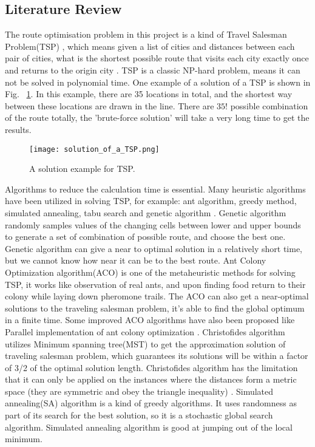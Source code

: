 \documentclass[project-plan]{report-template}
\begin{document}
\subsection {Literature Review}
The route optimisation problem in this project is a kind of Travel Salesman Problem(TSP) \cite{lawler1985travelling}, 
which means given a list of cities and distances between each pair of cities, what is the shortest possible
route that visits each city exactly once and returns to the origin city \cite{TSP_wiki}. 
TSP is a classic NP-hard problem, means it can not be solved in polynomial time.
One example of a solution of a TSP is shown in Fig.~ \ref{fig:solution_of_TSP}.
In this example, there are 35 locations in total, and the shortest way between these locations are drawn in the line.
There are $35!$ possible combination of the route totally, the 'brute-force solution' will take a very long time to get the results.\\
\begin{figure}
    \begin{center}
        \texttt{[image: solution\_of\_a\_TSP.png]}
    \end{center}
    \caption{\label{fig:solution_of_TSP} A solution example for TSP.}
\end{figure}

Algorithms to reduce the calculation time is essential. Many heuristic algorithms have been utilized in solving TSP\cite{TSP_review},
for example: ant algorithm, greedy method, simulated annealing, tabu search and genetic algorithm \cite{genetic_on_TSP}. 
Genetic algorithm randomly samples values of the changing cells between lower and upper bounds to generate
a set of combination of possible route, and choose the best one.
Genetic algorithm can give a near to optimal solution in a relatively short time, but we cannot know how near it can be to the best route.
Ant Colony Optimization algorithm(ACO) is one of the metaheuristic methods for solving TSP, 
it works like observation of real ants, and upon finding food return to their colony while laying down pheromone trails\cite{ACO_on_TSP}. 
The ACO can also get a near-optimal solutions to the traveling salesman problem, it's able to find the global optimum in a finite time.
Some improved ACO algorithms have also been proposed like Parallel implementation of ant colony optimization \cite{para_ACO}. 
Christofides algorithm\cite{VANBEVERN2020118} utilizes Minimum spanning tree(MST) to get the approximation solution of traveling salesman problem, 
which guarantees its solutions will be within a factor of 3/2 of the optimal solution length.
Christofides algorithm has the limitation that it can only be applied on the instances where the distances form a metric space (they are symmetric and obey the triangle inequality) \cite{christofides_inbook}.
Simulated annealing(SA) algorithm is a kind of greedy algorithms. It uses randomness as part of its search for the best solution, so it is a stochastic global search algorithm.
Simulated annealing algorithm is good at jumping out of the local minimum\cite{improved_SA}.\\
\end{document}
